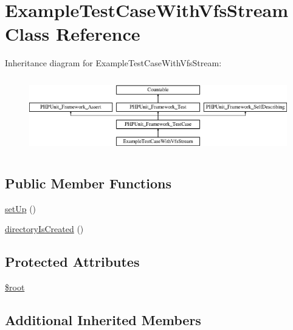 \hypertarget{classorg_1_1bovigo_1_1vfs_1_1example_1_1_example_test_case_with_vfs_stream}{}\section{Example\+Test\+Case\+With\+Vfs\+Stream Class Reference}
\label{classorg_1_1bovigo_1_1vfs_1_1example_1_1_example_test_case_with_vfs_stream}
Inheritance diagram for Example\+Test\+Case\+With\+Vfs\+Stream\+:\begin{figure}[H]
\begin{center}
\leavevmode
\includegraphics[height=3.303835cm]{classorg_1_1bovigo_1_1vfs_1_1example_1_1_example_test_case_with_vfs_stream}
\end{center}
\end{figure}
\subsection*{Public Member Functions}
\begin{DoxyCompactItemize}
\item 
\mbox{\hyperlink{classorg_1_1bovigo_1_1vfs_1_1example_1_1_example_test_case_with_vfs_stream_a0bc688732d2b3b162ffebaf7812e78da}{set\+Up}} ()
\item 
\mbox{\hyperlink{classorg_1_1bovigo_1_1vfs_1_1example_1_1_example_test_case_with_vfs_stream_ac7f8f5444c4b0b2163d0b49fd5ee3349}{directory\+Is\+Created}} ()
\end{DoxyCompactItemize}
\subsection*{Protected Attributes}
\begin{DoxyCompactItemize}
\item 
\mbox{\hyperlink{classorg_1_1bovigo_1_1vfs_1_1example_1_1_example_test_case_with_vfs_stream_ab37f7c32f41c3c61ed940887453767f4}{\$root}}
\end{DoxyCompactItemize}
\subsection*{Additional Inherited Members}


